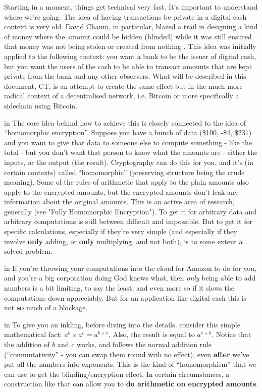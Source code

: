\documentclass[10pt,a4paper]{article}
\begin{document}
Starting in a moment, things get technical very fast. It's important to understand where we're going. The idea of having transactions be private in a digital cash context is very old. David Chaum, in particular, blazed a trail in designing a kind of money where the amount could be hidden (blinded) while it was still ensured that money was not being stolen or created from nothing \cite{chaum_bs}. This idea was initially applied to the following context: you want a bank to be the issuer of digital cash, but you want the users of the cash to be able to transact amounts that are kept private from the bank and any other observers. What will be described in this document, CT, is an attempt to create the same effect but in the much more radical context of a decentralised network, i.e. Bitcoin or more specifically a sidechain using Bitcoin.

 in \noindent The core idea behind how to achieve this is closely connected to the idea of ``homomorphic encryption''. Suppose you have a bunch of data (\$100, -\$4, \$231) and you want to give that data to someone else to compute something - like the total - but you don't want that person to know what the amounts are - either the inputs, or the output (the result). Cryptography can do this for you, and it's (in certain contexts) called ``homomorphic'' (preserving structure being the crude meaning). Some of the rules of arithmetic that apply to the plain amounts also apply to the encrypted amounts, but the encrypted amounts don't leak any information about the original amounts. This is an active area of research, generally (see "Fully Homomorphic Encryption"). To get it for arbitrary data and arbitrary computations is still between difficult and impossible. But to get it for specific calculations, especially if they're very simple (and especially if they involve \textbf{only} adding, or \textbf{only} multiplying, and not both), is to some extent a solved problem.

 in \noindent  If you're throwing your computations into the cloud for Amazon to do for you, and you're a big corporation doing God knows what, then \textit{only} being able to add numbers is a bit limiting, to say the least, and even more so if it slows the computations down appreciably. But for an application like digital cash this is not \textbf{so} much of a blockage.

 in \noindent  To give you an inkling, before diving into the details, consider this simple mathematical fact: $a^b \times a^c = a^{b+c}$. Also, the result is equal to $a^{c+b}$. Notice that the addition of $b$ and $c$ works, and follows the normal addition rule (``commutativity'' - you can swap them round with no effect), even \textbf{after} we've put all the numbers into exponents. This is the kind of ``homomorphism'' that we can use to get the blinding/encryption effect. In certain circumstances, a construction like that can allow you to \textbf{do arithmetic on encrypted amounts}.
\end{document}
